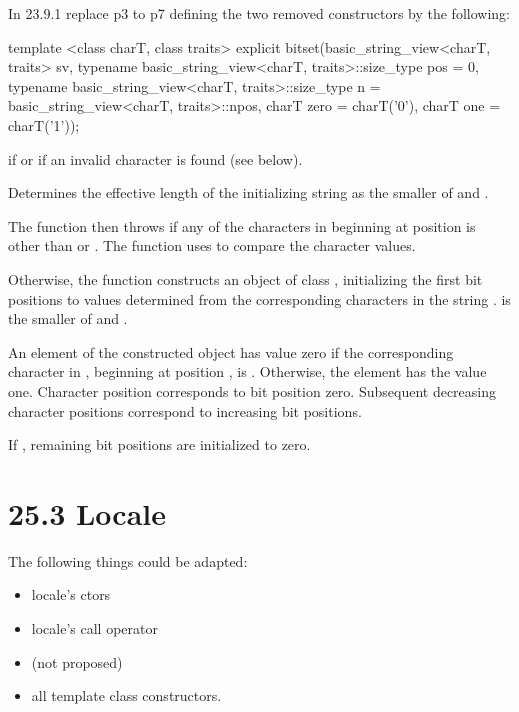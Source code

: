 \documentclass[ebook,11pt,article]{memoir}
\begin{document}
In 23.9.1 replace p3 to p7 defining the two removed constructors by the following:

\begin{addedblock}
\begin{itemdecl}
template <class charT, class traits>
explicit
bitset(basic_string_view<charT, traits> sv,
       typename basic_string_view<charT, traits>::size_type pos = 0,
       typename basic_string_view<charT, traits>::size_type n =
         basic_string_view<charT, traits>::npos,
         charT zero = charT('0'), charT one = charT('1'));
\end{itemdecl}

\begin{itemdescr}
\pnum
\throws
{}
if
or  if an invalid character is found (see below).%

\pnum
\effects
Determines the effective length
 of the initializing string as the smaller of
 and
.

The function then throws%
if any of the 
characters in  beginning at position  is
other than  or . The function uses 
to compare the character values.

Otherwise, the function constructs an object of class
,
initializing the first  bit
positions to values determined from the corresponding characters in the string
.
 is the smaller of  and .

\pnum
An element of the constructed object has value zero if the
corresponding character in , beginning at position
, is
.
Otherwise, the element has the value one.
Character position  corresponds to bit position zero.
Subsequent decreasing character positions correspond to increasing bit positions.

\pnum
If , remaining bit positions are initialized to zero.
\end{itemdescr}
\end{addedblock}

\section{25.3 Locale}
The following things could be adapted:
\begin{itemize}
\item locale's ctors 
\item locale's call operator
\item {} (not proposed)
\item all  template class constructors.
\end{itemize}
\end{document}
